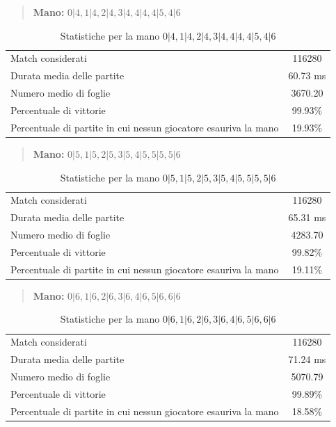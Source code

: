 \documentclass[a4paper,12pt]{report}
\begin{document}
\begin{quote}
    \textbf{Mano:} \(0|4, 1|4, 2|4, 3|4, 4|4, 4|5, 4|6\)
\end{quote}

\begin{table}[h!]
    \centering
    \begin{tabular}{|l|c|}
        \hline
        Match considerati & 116280 \\
        Durata media delle partite &  60.73 ms \\
        Numero medio di foglie &  3670.20 \\
        Percentuale di vittorie & 99.93\% \\
        Percentuale di partite in cui nessun giocatore esauriva la mano &  19.93\% \\
        \hline
    \end{tabular}
    \caption{Statistiche per la mano \(0|4, 1|4, 2|4, 3|4, 4|4, 4|5, 4|6\)}
    \label{tab:stats_tutti_4}
\end{table}


\begin{quote}
    \textbf{Mano:} \(0|5, 1|5, 2|5, 3|5, 4|5, 5|5, 5|6\)
\end{quote}

\begin{table}[h!]
    \centering
    \begin{tabular}{|l|c|}
        \hline
        Match considerati & 116280 \\
        Durata media delle partite &  65.31 ms \\
        Numero medio di foglie &   4283.70 \\
        Percentuale di vittorie & 99.82\% \\
        Percentuale di partite in cui nessun giocatore esauriva la mano &  19.11\% \\
        \hline
    \end{tabular}
    \caption{Statistiche per la mano \(0|5, 1|5, 2|5, 3|5, 4|5, 5|5, 5|6\)}
    \label{tab:stats_tutti_5}
\end{table}


\begin{quote}
    \textbf{Mano:} \(0|6, 1|6, 2|6, 3|6, 4|6, 5|6, 6|6\)
\end{quote}

\begin{table}[h!]
    \centering
    \begin{tabular}{|l|c|}
        \hline
        Match considerati & 116280 \\
        Durata media delle partite &  71.24 ms \\
        Numero medio di foglie &  5070.79 \\
        Percentuale di vittorie & 99.89\% \\
        Percentuale di partite in cui nessun giocatore esauriva la mano &  18.58\% \\
        \hline
    \end{tabular}
    \caption{Statistiche per la mano \(0|6, 1|6, 2|6, 3|6, 4|6, 5|6, 6|6\)}
    \label{tab:stats_tutti_6}
\end{table}
\end{document}
